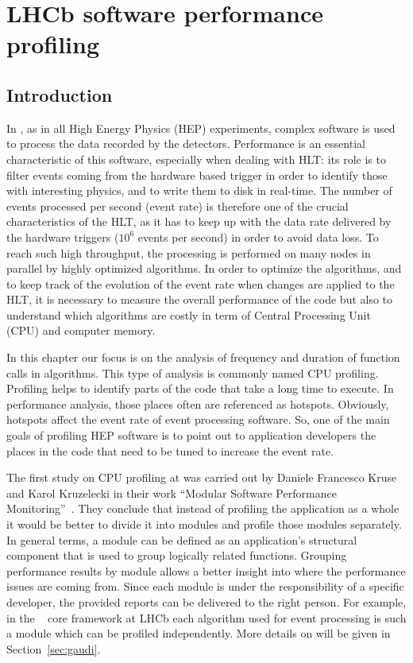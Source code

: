 \chapter{LHCb software performance profiling}
\section{Introduction}

In \lhcb, as in all High Energy Physics (HEP) experiments, complex software is
used to process the data recorded by the detectors. Performance is an essential
characteristic of this software, especially when dealing with HLT: its role is
to filter events coming from the hardware based trigger in order to identify
those with interesting physics, and to write them to disk in real-time. The
number of events processed per second (event rate) is therefore one of the
crucial characteristics of the HLT, as it has to keep up with the data rate
delivered by the hardware triggers ($10^6$ events per second) in order to avoid
data loss. To reach such high throughput, the processing is performed on many
nodes in parallel by highly optimized algorithms. In order to optimize the
algorithms, and to keep track of the evolution of the event rate when changes
are applied to the HLT, it is necessary to measure the overall performance of
the code but also to understand which algorithms are costly in term of Central
Processing Unit (CPU) and computer memory.

In this chapter our focus is on the analysis of frequency and duration of
function calls in algorithms. This type of analysis is commonly named CPU
profiling. Profiling helps to identify parts of the code that take a long time
to execute. In performance analysis, those places often are referenced as
hotspots. Obviously,  hotspots affect the event rate of event processing
software. So, one of the main goals of profiling HEP software is to point out
to application developers the places in the code that need to be tuned to
increase the event rate.

The first study on CPU profiling at \lhcb was carried out by Daniele Francesco
Kruse and Karol Kruzelecki in their work ``Modular Software Performance
Monitoring''~\cite{modular}. They conclude that instead of profiling the
application as a whole it would be better to divide it into modules and profile
those modules separately. In general terms, a module can be defined as an
application's structural component that is used to group logically related
functions.  Grouping performance results by module allows a better insight into
where the performance issues are coming from. Since each module is under the
responsibility of a specific developer, the provided reports can be delivered
to the right person. For example, in the \gaudi~\cite{Barrand:2001ny} core
framework at LHCb each algorithm used for event processing is such a module
which can be profiled independently. More details on \gaudi will be given in
Section~\ref{sec:gaudi}.

